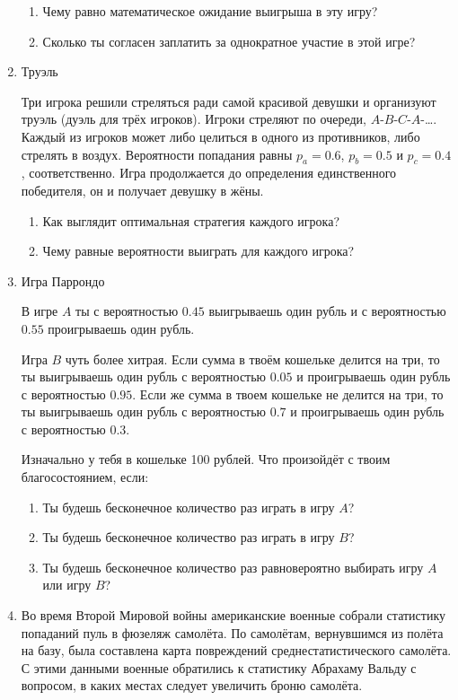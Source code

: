 \documentclass[nobib]{tufte-handout}
\begin{document}
\begin{enumerate}
\begin{enumerate}
\item Чему равно математическое ожидание выигрыша в эту игру?
\item Сколько ты согласен заплатить за однократное участие в этой игре?
\end{enumerate}


\item Труэль

Три игрока решили стреляться ради самой красивой девушки и организуют труэль (дуэль для трёх игроков).  Игроки стреляют по очереди, $A$-$B$-$C$-$A$-\ldots. Каждый из игроков может либо целиться в одного из противников, либо стрелять в воздух. Вероятности попадания равны $p_a=0.6$, $p_b=0.5$ и $p_c=0.4$, соответственно. Игра продолжается до определения единственного победителя, он и получает девушку в жёны. 

\begin{enumerate}
\item Как выглядит оптимальная стратегия каждого игрока?
\item Чему равные вероятности выиграть для каждого игрока?
\end{enumerate}



\item Игра Паррондо

В игре $A$ ты с вероятностью $0.45$ выигрываешь один рубль и с вероятностью $0.55$ проигрываешь один рубль. 

Игра $B$ чуть более хитрая. Если сумма в твоём кошельке делится на три, то ты выигрываешь один рубль с вероятностью $0.05$ и проигрываешь один рубль с вероятностью $0.95$. Если же
сумма в твоем кошельке не делится на три, то ты выигрываешь один рубль с вероятностью $0.7$ и проигрываешь один рубль с вероятностью $0.3$.

Изначально у тебя в кошельке 100 рублей. Что произойдёт с твоим благосостоянием, если:

\begin{enumerate}
\item Ты будешь бесконечное количество раз играть в игру $A$?
\item Ты будешь бесконечное количество раз играть в игру $B$?
\item Ты будешь бесконечное количество раз равновероятно выбирать игру $A$ или игру $B$?
\end{enumerate}



\item Во время Второй Мировой войны американские военные собрали статистику попаданий пуль в фюзеляж самолёта.  По самолётам, вернувшимся из полёта на базу, была составлена карта повреждений среднестатистического самолёта. С этими данными военные обратились к статистику Абрахаму Вальду с вопросом, в каких местах следует увеличить броню самолёта.


\end{enumerate}
\end{document}
